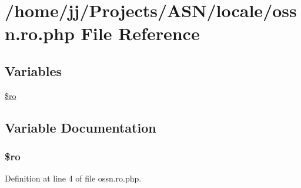 \hypertarget{locale_2ossn_8ro_8php}{}\section{/home/jj/\+Projects/\+A\+S\+N/locale/ossn.ro.\+php File Reference}
\label{locale_2ossn_8ro_8php}
\subsection*{Variables}
\begin{DoxyCompactItemize}
\item 
\hyperlink{locale_2ossn_8ro_8php_ad432e1965f7fa8ce0807b244734e70f8}{\$ro}
\end{DoxyCompactItemize}


\subsection{Variable Documentation}
\subsubsection[{\texorpdfstring{\$ro}{$ro}}]{\setlength{\rightskip}{0pt plus 5cm}\$ro}\hypertarget{locale_2ossn_8ro_8php_ad432e1965f7fa8ce0807b244734e70f8}{}\label{locale_2ossn_8ro_8php_ad432e1965f7fa8ce0807b244734e70f8}


Definition at line 4 of file ossn.\+ro.\+php.


